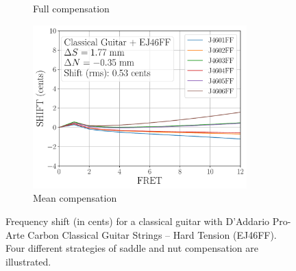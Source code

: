 \begin{figure}
\begin{subfigure}[b]{0.46\textwidth}
    \caption{Full compensation}
    \label{fig:shift_classicalguitar_ej46ff_full}
   \end{subfigure}
   \hspace{0.25in}
   \begin{subfigure}[b]{0.46\textwidth}
    \centering
    \includegraphics[width=3.25in]{../figures/shift_classicalguitar_ej46ff_mean}
    \caption{Mean compensation}
    \label{fig:shift_classicalguitar_ej46ff_mean}
   \end{subfigure}
   \caption{\label{fig:compensation_classicalguitar_ej46ff} Frequency shift (in cents) for a classical guitar with D'Addario Pro-Arte Carbon Classical Guitar Strings -- Hard Tension (EJ46FF). Four different strategies of saddle and nut compensation are illustrated.}
 \end{figure}
 